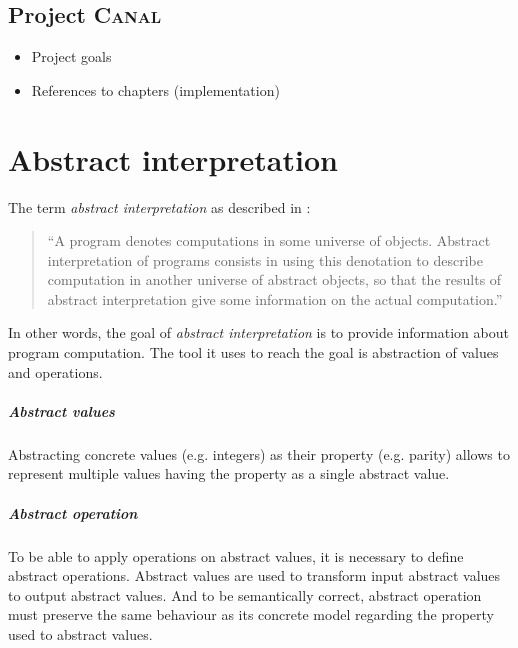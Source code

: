 \documentclass[12pt,oneside,draft]{fithesis2}
\begin{document}
\section{Project \textsc{Canal}}
\begin{itemize}
  \item Project goals
  \item References to chapters (implementation)
\end{itemize}


\chapter{Abstract interpretation}\label{ch:abstract-interpretation}

The term \textit{abstract interpretation} as described in \cite{CousotCousot77-1}:

\begin{quotation}
``A program denotes computations in some universe of objects. Abstract interpretation of programs consists in using this denotation to describe computation in another universe of abstract objects, so that the results of abstract interpretation give some information on the actual computation.''
\end{quotation}

In other words, the goal of \textit{abstract interpretation} is to provide information about program computation. The tool it uses to reach the goal is abstraction of values and operations.

\paragraph{Abstract values}
Abstracting concrete values (e.g. integers) as their property (e.g. parity) allows to represent multiple values having the property as a single abstract value.

\paragraph{Abstract operation}
To be able to apply operations on abstract values, it is necessary to define abstract operations. Abstract values are used to transform input abstract values to output abstract values. And to be semantically correct, abstract operation must preserve the same behaviour as its concrete model regarding the property used to abstract values.
\end{document}
